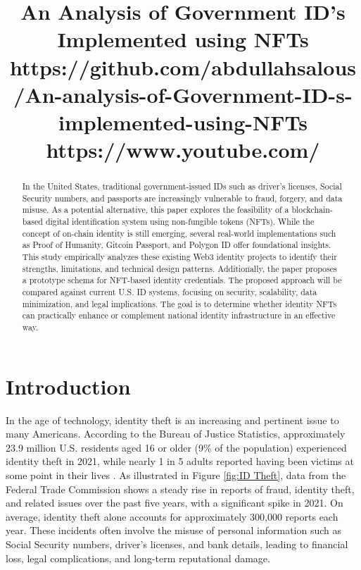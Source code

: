 \documentclass[conference]{IEEEtran}
\begin{document}
\title {An Analysis of Government ID’s Implemented using NFTs \\[1ex] \large https://github.com/abdullahsalous/An-analysis-of-Government-ID-s-implemented-using-NFTs \\[1ex] \large https://www.youtube.com/}

\author{
}

\maketitle

\begin{abstract}
In the United States, traditional government-issued IDs such as driver's licenses, Social Security numbers, and passports are increasingly vulnerable to fraud, forgery, and data misuse. As a potential alternative, this paper explores the feasibility of a blockchain-based digital identification system using non-fungible tokens (NFTs). While the concept of on-chain identity is still emerging, several real-world implementations such as Proof of Humanity, Gitcoin Passport, and Polygon ID offer foundational insights. This study empirically analyzes these existing Web3 identity projects to identify their strengths, limitations, and technical design patterns. Additionally, the paper proposes a prototype schema for NFT-based identity credentials. The proposed approach will be compared against current U.S. ID systems, focusing on security, scalability, data minimization, and legal implications. The goal is to determine whether identity NFTs can practically enhance or complement national identity infrastructure in an effective way.
\end{abstract}

\section{Introduction}
In the age of technology, identity theft is an increasing and pertinent issue to many Americans. According to the Bureau of Justice Statistics, approximately 23.9 million U.S. residents aged 16 or older (9\% of the population) experienced identity theft in 2021, while nearly 1 in 5 adults reported having been victims at some point in their lives \cite{Bureau of Justice Statistics}. As illustrated in Figure \ref{fig:ID Theft}, data from the Federal Trade Commission shows a steady rise in reports of fraud, identity theft, and related issues over the past five years, with a significant spike in 2021. On average, identity theft alone accounts for approximately 300,000 reports each year. These incidents often involve the misuse of personal information such as Social Security numbers, driver's licenses, and bank details, leading to financial loss, legal complications, and long-term reputational damage. 
\end{document}

